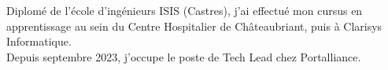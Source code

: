 \documentclass[9pt]{developercv} %
\begin{document}
\begin{minipage}[t]{0.4\textwidth} %
	\vspace{-\baselineskip} %
	Diplomé de l'école d'ingénieurs ISIS (Castres), j'ai effectué mon cursus en apprentissage au sein du
	Centre Hospitalier de Châteaubriant, puis à Clarisys Informatique.\\
	Depuis septembre 2023, j'occupe le poste de Tech Lead chez Portalliance.
\end{minipage}
\hfill %
\begin{minipage}[t]{0.5\textwidth} %
	\vspace{-\baselineskip} %
	\begin{barchart}{5.5}
	\end{barchart}
\end{minipage}


\end{document}
